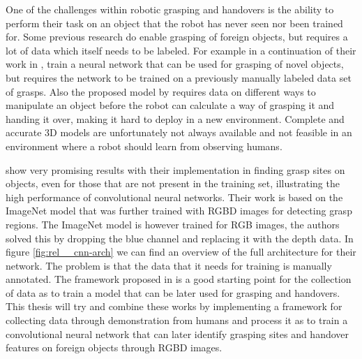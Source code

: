 One of the challenges within robotic grasping and handovers is the ability to perform their task on an object that the robot has never seen nor been trained for. Some previous research do enable grasping of foreign objects, but requires a lot of data which itself needs to be labeled. For example \textcite{Huebner2008a} in a continuation of their work in \parencite{Huebner2008}, train a neural network that can be used for grasping of novel objects, but requires the network to be trained on a previously manually labeled data set of grasps. Also the proposed model by \parencite{Chan2014} requires data on different ways to manipulate an object before the robot can calculate a way of grasping it and handing it over, making it hard to deploy in a new environment. Complete and accurate 3D models are unfortunately not always available and not feasible in an environment where a robot should learn from observing humans.

\textcite{Redmon2014} show very promising results with their implementation in finding grasp sites on objects, even for those that are not present in the training set, illustrating the high performance of convolutional neural networks. Their work is based on the ImageNet model that was further trained with RGBD images for detecting grasp regions. The ImageNet model is however trained for RGB images, the authors solved this by dropping the blue channel and replacing it with the depth data. In figure \ref{fig:rel__cnn-arch} we can find an overview of the full architecture for their network. The problem is that the data that it needs for training is manually annotated. The framework proposed in \parencite{Chan2015a} is a good starting point for the collection of data as to train a model that can be later used for grasping and handovers. This thesis will try and combine these works by implementing a framework for collecting data through demonstration from humans and process it as to train a convolutional neural network that can later identify grasping sites and handover features on foreign objects through RGBD images.
